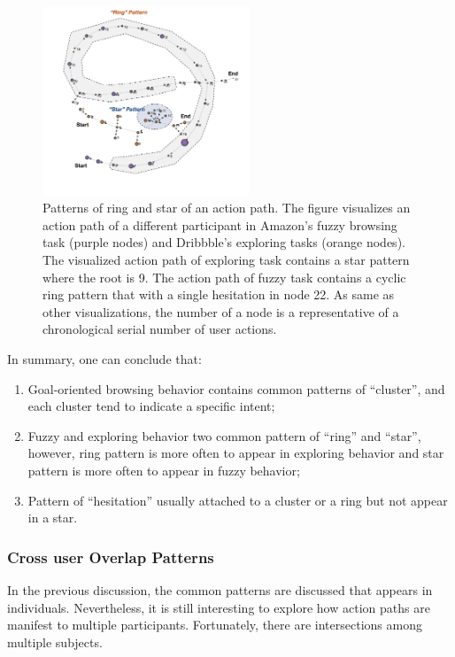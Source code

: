 \begin{figure}[H]
    \centering
    \includegraphics[width=0.55\textwidth]{figures/vis-patterns2}
    \caption{Patterns of ring and star of an action path. The figure visualizes an action path
    of a different participant in
    Amazon's fuzzy browsing task (purple nodes) and Dribbble's exploring tasks (orange nodes). 
    The visualized action path of exploring task contains a star pattern where the root is 9.
    The action path of fuzzy task contains a cyclic ring pattern that with a single hesitation
    in node 22.
    As same as other visualizations, the number of a node
    is a representative of a chronological serial number of user actions.}
    \label{fig:vis-fuzzy-explore2}
\end{figure}

In summary, one can conclude that:

\begin{enumerate}
    \item Goal-oriented browsing behavior contains common patterns of ``cluster'', and each cluster tend to indicate a specific intent;
    \item Fuzzy and exploring behavior two common pattern of ``ring'' and ``star'', however, ring pattern is more often to appear 
          in exploring behavior and star pattern is more often to appear in fuzzy behavior;
    \item Pattern of ``hesitation'' usually attached to a cluster or a ring but not appear in a star.
\end{enumerate}

\subsubsection{Cross user Overlap Patterns}

In the previous discussion, the common patterns are discussed that appears in individuals.
Nevertheless, it is still interesting to explore how action paths are manifest to multiple
participants. Fortunately, there are intersections among multiple subjects.

